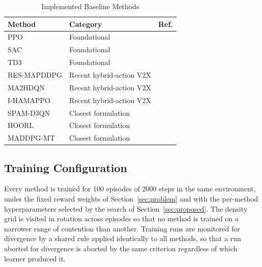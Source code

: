\documentclass[journal]{IEEEtran}
\begin{document}
\begin{table}[!t]
\centering
\caption{Implemented Baseline Methods}
\label{tab:baselines}
\begin{tabular}{llc}
\toprule
\textbf{Method} & \textbf{Category} & \textbf{Ref.} \\
\midrule
PPO & Foundational & \cite{schulman2017} \\
SAC & Foundational & \cite{haarnoja2018} \\
TD3 & Foundational & \cite{fujimoto2018} \\
RES-MAPDDPG & Recent hybrid-action V2X & \cite{li2026} \\
MA2HDQN & Recent hybrid-action V2X & \cite{hong2026} \\
I-HAMAPPO & Recent hybrid-action V2X & \cite{chen2026} \\
SPAM-D3QN & Closest formulation & \cite{bai2024} \\
HOORL & Closest formulation & \cite{xu2026} \\
MADDPG-MT & Closest formulation & \cite{parvini2023} \\
\bottomrule
\end{tabular}
\end{table}

\subsection{Training Configuration}
Every method is trained for 100 episodes of 2000 steps in the same environment, under the fixed reward weights of Section~\ref{sec:problem} and with the per-method hyperparameters selected by the search of Section~\ref{sec:proposed}. The density grid is visited in rotation across episodes so that no method is trained on a narrower range of contention than another. Training runs are monitored for divergence by a shared rule applied identically to all methods, so that a run aborted for divergence is aborted by the same criterion regardless of which learner produced it.
\end{document}

